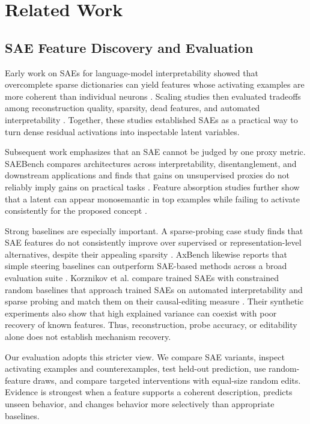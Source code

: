 \chapter{Related Work}
\label{chap:related-work}

\section{SAE Feature Discovery and Evaluation}

Early work on SAEs for language-model interpretability showed that overcomplete sparse dictionaries can yield features whose activating examples are more coherent than individual neurons \cite{cunningham2023sparse}. Scaling studies then evaluated tradeoffs among reconstruction quality, sparsity, dead features, and automated interpretability \cite{gao2025scaling}. Together, these studies established SAEs as a practical way to turn dense residual activations into inspectable latent variables.

Subsequent work emphasizes that an SAE cannot be judged by one proxy metric. SAEBench compares architectures across interpretability, disentanglement, and downstream applications and finds that gains on unsupervised proxies do not reliably imply gains on practical tasks \cite{karvonen2025saebench}. Feature absorption studies further show that a latent can appear monosemantic in top examples while failing to activate consistently for the proposed concept \cite{chanin2024absorption}.

Strong baselines are especially important. A sparse-probing case study finds that SAE features do not consistently improve over supervised or representation-level alternatives, despite their appealing sparsity \cite{kantamneni2025useful}. AxBench likewise reports that simple steering baselines can outperform SAE-based methods across a broad evaluation suite \cite{wu2025axbench}. Korznikov et al. compare trained SAEs with constrained random baselines that approach trained SAEs on automated interpretability and sparse probing and match them on their causal-editing measure \cite{korznikov2026sanity}. Their synthetic experiments also show that high explained variance can coexist with poor recovery of known features. Thus, reconstruction, probe accuracy, or editability alone does not establish mechanism recovery.

Our evaluation adopts this stricter view. We compare SAE variants, inspect activating examples and counterexamples, test held-out prediction, use random-feature draws, and compare targeted interventions with equal-size random edits. Evidence is strongest when a feature supports a coherent description, predicts unseen behavior, and changes behavior more selectively than appropriate baselines.


